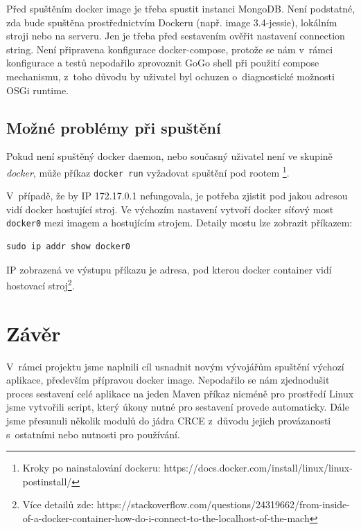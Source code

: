 \documentclass[12pt, a4paper]{article}
\begin{document}
Před spuštěním docker image je třeba spustit instanci MongoDB. Není podstatné, zda bude spuštěna prostřednictvím Dockeru (např. image 3.4-jessie), lokálním stroji nebo na serveru. Jen je třeba před sestavením ověřit nastavení connection string. Není připravena konfigurace docker-compose, protože se nám v~rámci konfigurace a testů nepodařilo zprovoznit GoGo shell při použití compose mechanismu, z~toho důvodu by uživatel byl ochuzen o~diagnostické možnosti OSGi runtime.


\subsection{Možné problémy při spuštění}
Pokud není spuštěný docker daemon, nebo současný uživatel není ve skupině \textit{docker}, může příkaz \verb|docker run| vyžadovat spuštění pod rootem \footnote{Kroky po nainstalování dockeru: https://docs.docker.com/install/linux/linux-postinstall/}.

V~případě, že by IP 172.17.0.1 nefungovala, je potřeba zjistit pod jakou adresou vidí docker hostující stroj. Ve výchozím nastavení vytvoří docker síťový most \verb|docker0| mezi imagem a hostujícím strojem. Detaily mostu lze zobrazit příkazem: 

\begin{verbatim}
sudo ip addr show docker0
\end{verbatim}

IP zobrazená ve výstupu příkazu je adresa, pod kterou docker container vidí hostovací stroj\footnote{Více detailů zde: https://stackoverflow.com/questions/24319662/from-inside-of-a-docker-container-how-do-i-connect-to-the-localhost-of-the-mach}.

\newpage
\section{Závěr}  %

V~rámci projektu jsme naplnili cíl usnadnit novým vývojářům spuštění výchozí aplikace, především přípravou docker image. Nepodařilo se nám zjednodušit proces sestavení celé aplikace na jeden Maven příkaz nicméně pro prostředí Linux jsme vytvořili script, který úkony nutné pro sestavení provede automaticky.
Dále jsme přesunuli několik modulů do jádra CRCE z~důvodu jejich provázanosti s~ostatními nebo nutnosti pro používání. 
\end{document}
